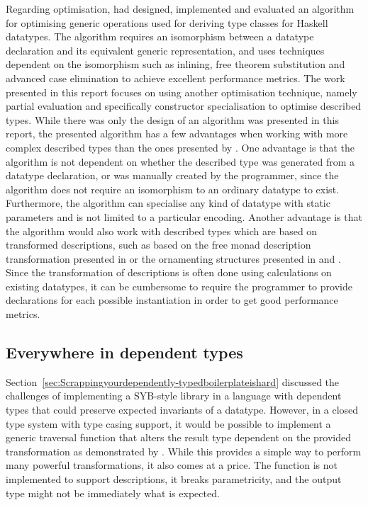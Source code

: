 \documentclass{ituthesis}
\theoremstyle{break}
\begin{document}
Regarding optimisation, \citeauthor{magalhaes2012less} had designed, implemented and evaluated an algorithm for optimising generic operations used for deriving type classes for Haskell datatypes.
The algorithm requires an isomorphism between a datatype declaration and its equivalent generic representation, and uses techniques dependent on the isomorphism such as inlining, free theorem substitution and advanced case elimination to achieve excellent performance metrics.
The work presented in this report focuses on using another optimisation technique, namely partial evaluation and specifically constructor specialisation to optimise described types.
While there was only the design of an algorithm was presented in this report, the presented algorithm has a few advantages when working with more complex described types than the ones presented by \citeauthor{magalhaes2012less}.
One advantage is that the algorithm is not dependent on whether the described type was generated from a datatype declaration, or was manually created by the programmer, since the algorithm does not require an isomorphism to an ordinary datatype to exist.
Furthermore, the algorithm can specialise any kind of datatype with static parameters and is not limited to a particular encoding.
Another advantage is that the algorithm would also work with described types which are based on transformed descriptions, such as based on the free monad description transformation presented in \textcite{Chapman:2010:GAL:1863543.1863547} or the ornamenting structures presented in \textcite{mcbride2010ornamental} and \textcite{dagand2012transporting}.
Since the transformation of descriptions is often done using calculations on existing datatypes, it can be cumbersome to require the programmer to provide declarations for each possible instantiation in order to get good performance metrics.

\subsection{Everywhere in dependent types}
\label{sub:Everywhere in dependent types}
Section~\ref{sec:Scrappingyourdependently-typedboilerplateishard} discussed the challenges of implementing a SYB-style library in a language with dependent types that could preserve expected invariants of a datatype.
However, in a closed type system with type casing support, it would be possible to implement a generic traversal function that alters the result type dependent on the provided transformation as demonstrated by \textcite{diehl2013every}.
While this provides a simple way to perform many powerful transformations, it also comes at a price.
The function is not implemented to support descriptions, it breaks parametricity, and the output type might not be immediately what is expected.
\end{document}
